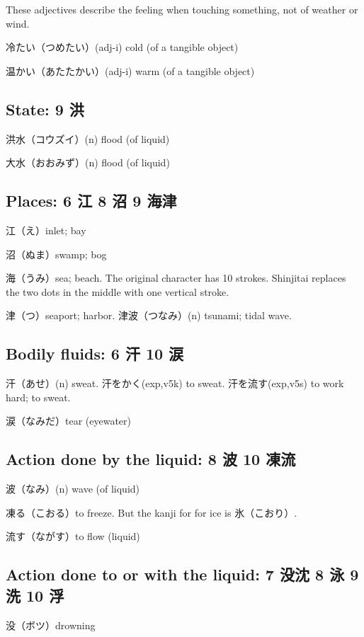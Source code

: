 These adjectives describe the feeling when
touching something, not of weather or wind.

冷たい（つめたい）(adj-i) cold (of a tangible object)

温かい（あたたかい）(adj-i) warm (of a tangible object)

\subsection{State: 9 洪}

洪水（コウズイ）(n) flood (of liquid)

大水（おおみず）(n) flood (of liquid)

\subsection{Places: 6 江 8 沼 9 海津}

江（え）inlet; bay

沼（ぬま）swamp; bog

海（うみ）sea; beach.
The original character has 10 strokes.
Shinjitai replaces the two dots in the middle
with one vertical stroke.

津（つ）seaport; harbor.
津波（つなみ）(n) tsunami; tidal wave.

\subsection{Bodily fluids: 6 汗 10 涙}

汗（あせ）(n) sweat.
汗をかく(exp,v5k) to sweat.
汗を流す(exp,v5s) to work hard; to sweat.

涙（なみだ）tear (eyewater)

\subsection{Action done by the liquid: 8 波 10 凍流}

波（なみ）(n) wave (of liquid)

凍る（こおる）to freeze.
But the kanji for for ice is 氷（こおり）.

流す（ながす）to flow (liquid)

\subsection{Action done to or with the liquid: 7 没沈 8 泳 9 洗 10 浮}

没（ボツ）drowning


